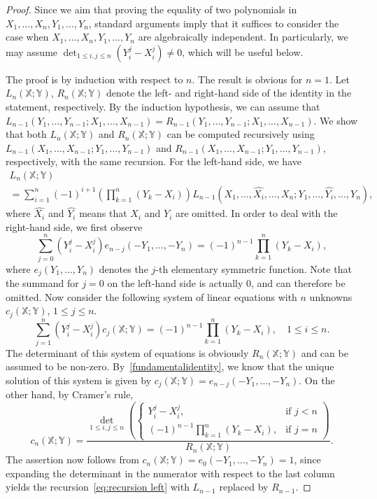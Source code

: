 \documentclass[11pt]{article}
\theoremstyle{definition}
\numberwithin{equation}{section}
\newcounter{x}
\newcounter{y}
\newcounter{z}
\begin{document}
\begin{proof}
Since we aim that proving the equality of two polynomials in $X_1,\ldots,X_n,\allowbreak Y_1,\ldots,Y_n$, standard arguments imply that it suffices to consider the case when $X_1,\ldots,X_n,\allowbreak Y_1,\ldots,Y_n$ are algebraically independent. In particularly, we may assume $\det_{1 \le i, j \le n} \left( Y_i^j - X_i^j \right) \not=0$, which will be useful below.

The proof is by induction with respect to $n$. The result is obvious for $n=1$. 
Let $L_n(\mathbb{X};\mathbb{Y})$, $R_n(\mathbb{X};\mathbb{Y})$ denote the left- and right-hand side of the identity in the statement, respectively. By the induction hypothesis, we can assume 
that $ L_{n-1}(Y_1,\ldots,Y_{n-1};X_1,\ldots,X_{n-1}) = R_{n-1}(Y_1,\ldots,Y_{n-1};X_1,\ldots,X_{n-1})$.
We show that both $L_n(\mathbb{X};\mathbb{Y})$ and $R_n(\mathbb{X};\mathbb{Y})$ can be computed recursively using 
$L_{n-1}(X_1,\ldots,X_{n-1};Y_1,\ldots,Y_{n-1})$ and $R_{n-1}(X_1,\ldots,X_{n-1};Y_1,\ldots,Y_{n-1})$, respectively, with the same recursion.
For the left-hand side, we have 
\begin{multline}
\label{eq:recursion left}
L_n(\mathbb{X};\mathbb{Y}) \\
=  \sum_{i=1}^{n} (-1)^{i+1}  \left( \prod_{k=1}^n (Y_k-X_i)  \right) 
L_{n-1}(X_1,\ldots,\widehat{X_i},\ldots,X_n;Y_1,\ldots,\widehat{Y_i},\ldots,Y_n),
\end{multline}
where $\widehat{X_i}$ and $\widehat{Y_i}$ means that $X_i$ and $Y_i$ are omitted.
In order to deal with the right-hand side, we first observe
\begin{equation}
\label{fundamentalidentity}
\sum_{j=0}^{n} (Y_i^j - X_i^j) e_{n-j}(-Y_1,\ldots,-Y_n) = (-1)^{n-1} \prod_{k=1}^{n} (Y_k-X_i),
\end{equation}
where $e_{j}(Y_1,\ldots,Y_n)$ denotes the $j$-th elementary symmetric function. Note that the summand for $j=0$ on the left-hand side is actually $0$, and can therefore be omitted.
Now consider the following system of linear equations with $n$ unknowns $c_j(\mathbb{X};\mathbb{Y})$, $1 \le j \le n$.
\[
\sum_{j=1}^{n} (Y_i^j - X_i^j)  c_j(\mathbb{X};\mathbb{Y})
= (-1)^{n-1} \prod_{k=1}^{n} (Y_k-X_i), \quad 1 \le i \le n.
\]
The determinant of this system of equations is obviously $R_n(\mathbb{X};\mathbb{Y})$ and can be assumed to be non-zero. By~\eqref{fundamentalidentity}, we know that the unique solution of this system is given by 
$
c_j(\mathbb{X};\mathbb{Y}) = e_{n-j}(-Y_1,\ldots,-Y_n).
$
On the other hand, by Cramer's rule, 
\[
c_n(\mathbb{X};\mathbb{Y}) = \frac{\det \limits_{1 \le i, j \le n} \left( \begin{cases}  Y_i^j - X_i^j, & \text{if $j<n$} \\
  (-1)^{n-1} \prod\limits_{k=1}^{n} (Y_k-X_i) , & \text{if $j=n$}  \end{cases} \right)}{R_n(\mathbb{X};\mathbb{Y})}.
\]
The assertion now follows from $c_n(\mathbb{X};\mathbb{Y}) = e_{0}(-Y_1,\ldots,-Y_n)=1$, since expanding the determinant in the numerator with respect to the last column yields the recursion~\eqref{eq:recursion left} with $L_{n-1}$ replaced by $R_{n-1}$.
\end{proof}
\end{document}
